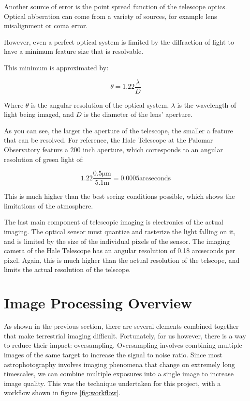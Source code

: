 \documentclass[conference]{IEEEtran}
\begin{document}
Another source of error is the point spread function of the telescope
optics. Optical abberation can come from a variety of sources, for
example lens misalignment or coma error. 

However, even a perfect optical system is limited by the diffraction of light to
have a minimum feature size that is resolvable.

This minimum is approximated by:

\begin{equation}
  \theta = 1.22 \frac{\lambda}{D}
\end{equation}

Where $\theta$ is the angular resolution of the optical system,
$\lambda$ is the wavelength of light being imaged, and $D$ is the
diameter of the lens' aperture.

As you can see, the larger the aperture of the telescope, the smaller
a feature that can be resolved. For reference, the Hale Telescope at
the Palomar Observatory featurs a 200 inch aperture, which corresponds
to an angular resolution of green light of:

\begin{equation}
 1.22 \frac{0.5 \mathrm{ \mu{}m}}{5.1\mathrm{ m}} = 0.0005\mathrm{ arcseconds} 
\end{equation}

This is much higher than the best seeing conditions possible, which
shows the limitations of the atmosphere. 

The last main component of telescopic imaging is electronics of the
actual imaging. The optical sensor must quantize and rasterize the
light falling on it, and is limited by the size of the individual
pixels of the sensor. The imaging camera of the Hale Telescope has an
angular resolution of 0.18 arcseconds per pixel. Again, this is much
higher than the actual resolution of the telscope, and limits the
actual resolution of the telscope.

\section{Image Processing Overview}

As shown in the previous section, there are several elements combined
together that make terrestrial imaging difficult. Fortunately, for us
however, there is a way to reduce their impact:
oversampling. Oversampling involves combining multiple images of the
same target to increase the signal to noise ratio. Since most
astrophotography involves imaging phenomena that change on extremely
long timescales, we can combine multiple exposures into a single image
to increase image quality. This was the technique undertaken for this
project, with a workflow shown in figure \ref{fig:workflow}.
\end{document}
